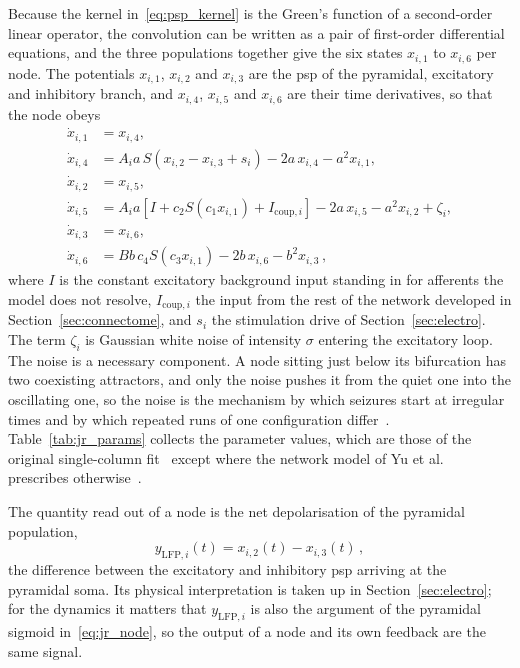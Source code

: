 Because the kernel in~\eqref{eq:psp_kernel} is the Green's function of a second-order linear
operator, the convolution can be written as a pair of first-order differential equations, and
the three populations together give the six states $x_{i,1}$ to $x_{i,6}$ per node. The
potentials $x_{i,1}$, $x_{i,2}$ and $x_{i,3}$ are the \ac{psp} of the pyramidal, excitatory and
inhibitory branch, and $x_{i,4}$, $x_{i,5}$ and $x_{i,6}$ are their time derivatives, so that
the node obeys
%
\begin{align}
    \dot{x}_{i,1} &= x_{i,4}, \nonumber \\
    \dot{x}_{i,4} &= A_i a\, S\!\left(x_{i,2} - x_{i,3} + s_i\right) - 2 a\, x_{i,4} - a^2 x_{i,1}, \nonumber \\
    \dot{x}_{i,2} &= x_{i,5}, \nonumber \\
    \dot{x}_{i,5} &= A_i a \left[ I + c_2 S\!\left(c_1 x_{i,1}\right) + I_{\mathrm{coup},i} \right] - 2 a\, x_{i,5} - a^2 x_{i,2} + \zeta_i, \label{eq:jr_node} \\
    \dot{x}_{i,3} &= x_{i,6}, \nonumber \\
    \dot{x}_{i,6} &= B b\, c_4 S\!\left(c_3 x_{i,1}\right) - 2 b\, x_{i,6} - b^2 x_{i,3} \,, \nonumber
\end{align}
%
where $I$ is the constant excitatory background input standing in for afferents the model does
not resolve, $I_{\mathrm{coup},i}$ the input from the rest of the network developed in
Section~\ref{sec:connectome}, and $s_i$ the stimulation drive of Section~\ref{sec:electro}.
The term $\zeta_i$ is Gaussian white noise of intensity $\sigma$ entering the excitatory loop.
The noise is a necessary component. A node sitting just below its bifurcation has two
coexisting attractors, and only the noise pushes it from the quiet one into the
oscillating one, so the noise is the mechanism by which
seizures start at irregular times and by which repeated runs of one configuration differ~\cite{Yu2024}. Table~\ref{tab:jr_params} collects the parameter values, which are those of the %
original single-column fit~\cite{Jansen1995} except where the network model of Yu et al.\ %
prescribes otherwise~\cite{Yu2024}. %

The quantity read out of a node is the net depolarisation of the pyramidal population,
%
\begin{equation}
    y_{\mathrm{LFP},i}(t) = x_{i,2}(t) - x_{i,3}(t) \,,
    \label{eq:lfp}
\end{equation}
%
the difference between the excitatory and inhibitory \ac{psp} arriving at the pyramidal
soma. Its physical interpretation is taken up in Section~\ref{sec:electro}; for the dynamics
it matters that $y_{\mathrm{LFP},i}$ is also the argument of the pyramidal sigmoid in~\eqref{eq:jr_node}, so the output of a node and its own feedback are the same signal.

